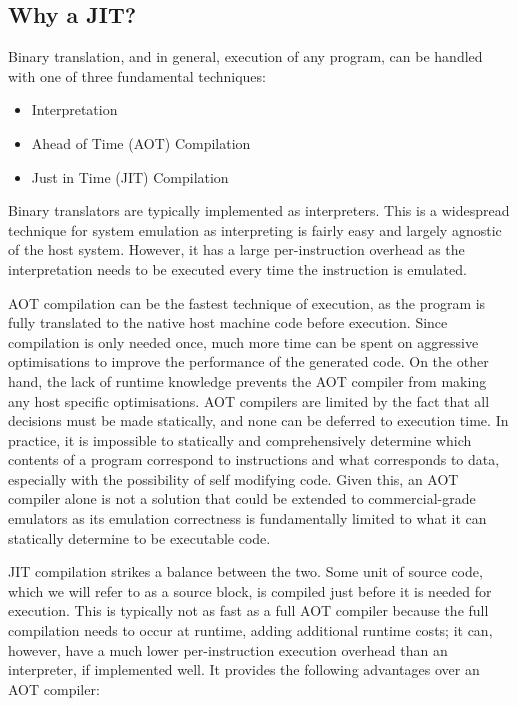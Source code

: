 \subsection{Why a JIT?}
\label{section:intro-jit}

Binary translation, and in general, execution of any program, can be handled with one of three fundamental techniques:

\begin{itemize}
    \item Interpretation
    \item Ahead of Time (AOT) Compilation
    \item Just in Time (JIT) Compilation
\end{itemize}

Binary translators are typically implemented as interpreters. This is a widespread technique for system emulation as interpreting is fairly easy and largely agnostic of the host system. However, it has a large per-instruction overhead as the interpretation needs to be executed every time the instruction is emulated.

AOT compilation can be the fastest technique of execution, as the program is fully translated to the native host machine code before execution. Since compilation is only needed once, much more time can be spent on aggressive optimisations to improve the performance of the generated code. On the other hand, the lack of runtime knowledge prevents the AOT compiler from making any host specific optimisations. AOT compilers are limited by the fact that all decisions must be made statically, and none can be deferred to execution time. In practice, it is impossible to statically and comprehensively determine which contents of a program correspond to instructions and what corresponds to data, especially with the possibility of self modifying code. Given this, an AOT compiler alone is not a solution that could be extended to commercial-grade emulators as its emulation correctness is fundamentally limited to what it can statically determine to be executable code.

JIT compilation strikes a balance between the two. Some unit of source code, which we will refer to as a source block, is compiled just before it is needed for execution. This is typically not as fast as a full AOT compiler because the full compilation needs to occur at runtime, adding additional runtime costs; it can, however, have a much lower per-instruction execution overhead than an interpreter, if implemented well. It provides the following advantages over an AOT compiler:

